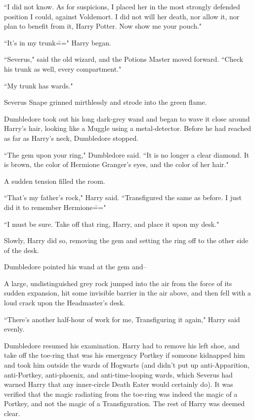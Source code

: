 ``I did not know. As for suspicions, I placed her in the most strongly defended position I could, against Voldemort. I did not will her death, nor allow it, nor plan to benefit from it, Harry Potter. Now show me your pouch."

``It's in my trunk\===" Harry began.

``Severus," said the old wizard, and the Potions Master moved forward. ``Check his trunk as well, every compartment."

``My trunk has wards."

Severus Snape grinned mirthlessly and strode into the green flame.

Dumbledore took out his long dark-grey wand and began to wave it close around Harry's hair, looking like a Muggle using a metal-detector. Before he had reached as far as Harry's neck, Dumbledore stopped.

``The gem upon your ring," Dumbledore said. ``It is no longer a clear diamond. It is brown, the color of Hermione Granger's eyes, and the color of her hair."

A sudden tension filled the room.

``That's my father's rock," Harry said. ``Transfigured the same as before. I just did it to remember Hermione\==="

``I must be sure. Take off that ring, Harry, and place it upon my desk."

Slowly, Harry did so, removing the gem and setting the ring off to the other side of the desk.

Dumbledore pointed his wand at the gem and\---

A large, undistinguished grey rock jumped into the air from the force of its sudden expansion, hit some invisible barrier in the air above, and then fell with a loud crack upon the Headmaster's desk.

``There's another half-hour of work for me, Transfiguring it again," Harry said evenly.

Dumbledore resumed his examination. Harry had to remove his left shoe, and take off the toe-ring that was his emergency Portkey if someone kidnapped him and took him outside the wards of Hogwarts (and didn't put up anti-Apparition, anti-Portkey, anti-phoenix, and anti-time-looping wards, which Severus had warned Harry that any inner-circle Death Eater would certainly do). It was verified that the magic radiating from the toe-ring was indeed the magic of a Portkey, and not the magic of a Transfiguration. The rest of Harry was deemed clear.

